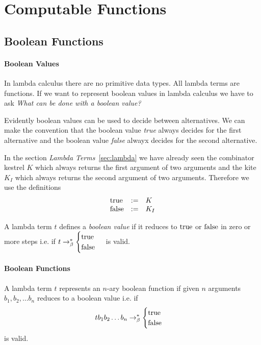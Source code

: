 \section{Computable Functions}
\label{sec:computable}

\subsection {Boolean Functions}

\paragraph{Boolean Values}

In lambda calculus there are no primitive data types. All lambda terms are
functions. If we want to represent boolean values in lambda calculus we have
to ask \emph{What can be done with a boolean value?}

Evidently boolean values can be used to decide between alternatives. We can
make the convention that the boolean value \emph{true} always decides for the
first alternative and the boolean value \emph{false} alwayx decides for the
second alternative.

In the section \emph{Lambda Terms}~\ref{sec:lambda} we have already seen the
combinator kestrel $K$ which always returns the first argument of two
arguments and the kite $K_I$ which always returns the second argument of two
arguments. Therefore we use the definitions
$$
\begin{array}{lll}
  \text{true}  & := & K \\
  \text{false} & := & K_I
\end{array}$$


\begin{definition}
  A lambda term $t$ defines a \emph{boolean value} if it reduces to $\text{true}$ or
  $\text{false}$ in zero or more steps i.e. if
  $t \to^*_\beta
  \begin{cases} \text{true} \\ \text{false}
  \end{cases}$
  is valid.
\end{definition}



\paragraph{Boolean Functions}

\begin{definition}
  A lambda term $t$ represents an $n$-ary boolean function if given $n$
  arguments $b_1, b_2, \ldots b_n$ reduces to a boolean value i.e. if
  $$t b_1 b_2 \ldots b_n \to^*_\beta
  \begin{cases} \text{true} \\ \text{false}
  \end{cases}$$
  is valid.
\end{definition}



